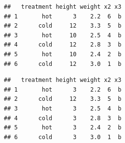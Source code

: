 \documentclass[krantz2]{krantz}\usepackage{knitr}
\begin{document}
\begin{knitrout}
\begin{kframe}
\begin{alltt}
\hlstd{a.df[}\hlstd{,} \hlstd{]} \hlkwb{<-} \hlstd{a.df[}\hlstd{,} \hlstd{]}
\end{alltt}
\begin{verbatim}
##   treatment height weight x2 x3
## 1       hot      3    2.2  6  b
## 2      cold     12    3.3  5  b
## 3       hot     10    2.5  4  b
## 4      cold     12    2.8  3  b
## 5       hot     10    2.4  2  b
## 6      cold     12    3.0  1  b
\end{verbatim}
\begin{alltt}
\hlstd{a.df[}\hlopt{:}\hlstd{,} \hlstd{]} \hlkwb{<-} \hlstd{a.df[}\hlstd{,} \hlstd{]}
\end{alltt}
\begin{verbatim}
##   treatment height weight x2 x3
## 1       hot      3    2.2  6  b
## 2      cold     12    3.3  5  b
## 3       hot      3    2.5  4  b
## 4      cold      3    2.8  3  b
## 5       hot      3    2.4  2  b
## 6      cold      3    3.0  1  b
\end{verbatim}
\end{kframe}
\end{knitrout}
\end{document}

